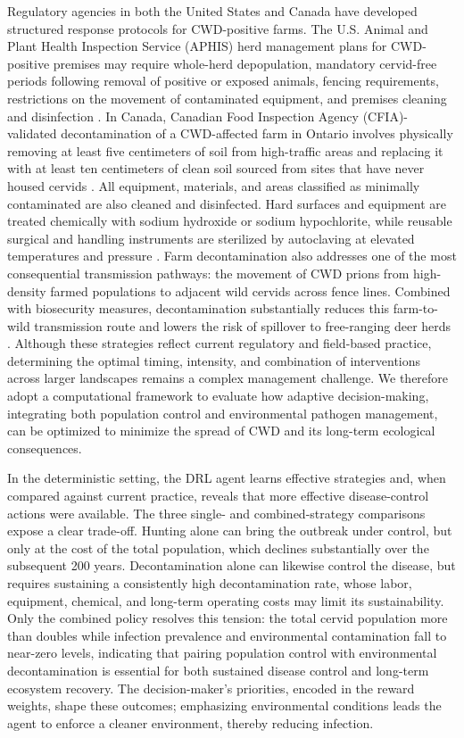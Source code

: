 \documentclass[12pt,a4paper,reqno]{amsart}
\theoremstyle{definition}
\theoremstyle{remark}
\theoremstyle{plain}
\begin{document}
Regulatory agencies in both the United States and Canada have developed structured response protocols for CWD-positive farms. The U.S. Animal and Plant Health Inspection Service (APHIS) herd management plans for CWD-positive premises may require whole-herd depopulation, mandatory cervid-free periods following removal of positive or exposed animals, fencing requirements, restrictions on the movement of contaminated equipment, and premises cleaning and disinfection \cite{aphis2023program}. In Canada, Canadian Food Inspection Agency (CFIA)-validated decontamination of a CWD-affected farm in Ontario involves physically removing at least five centimeters of soil from high-traffic areas and replacing it with at least ten centimeters of clean soil sourced from sites that have never housed cervids \cite{morgan2023gslr}. All equipment, materials, and areas classified as minimally contaminated are also cleaned and disinfected. Hard surfaces and equipment are treated chemically with sodium hydroxide or sodium hypochlorite, while reusable surgical and handling instruments are sterilized by autoclaving at elevated temperatures and pressure \cite{trapotsis2016prion, mcdonnell2003challenge}. Farm decontamination also addresses one of the most consequential transmission pathways: the movement of CWD prions from high-density farmed populations to adjacent wild cervids across fence lines. Combined with biosecurity measures, decontamination substantially reduces this farm-to-wild transmission route and lowers the risk of spillover to free-ranging deer herds \cite{kincheloe2021chronic}. Although these strategies reflect current regulatory and field-based practice, determining the optimal timing, intensity, and combination of interventions across larger landscapes remains a complex management challenge. We therefore adopt a computational framework to evaluate how adaptive decision-making, integrating both population control and environmental pathogen management, can be optimized to minimize the spread of CWD and its long-term ecological consequences.

In the deterministic setting, the DRL agent learns effective strategies and, when compared against current practice, reveals that more effective disease-control actions were available. The three single- and combined-strategy comparisons expose a clear trade-off. Hunting alone can bring the outbreak under control, but only at the cost of the total population, which declines substantially over the subsequent 200 years. Decontamination alone can likewise control the disease, but requires sustaining a consistently high decontamination rate, whose labor, equipment, chemical, and long-term operating costs may limit its sustainability. Only the combined policy resolves this tension: the total cervid population more than doubles while infection prevalence and environmental contamination fall to near-zero levels, indicating that pairing population control with environmental decontamination is essential for both sustained disease control and long-term ecosystem recovery. The decision-maker's priorities, encoded in the reward weights, shape these outcomes; emphasizing environmental conditions leads the agent to enforce a cleaner environment, thereby reducing infection.
\end{document}
